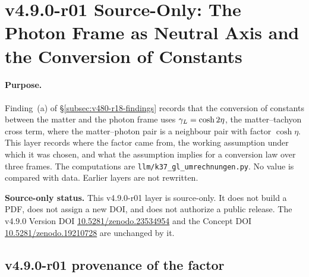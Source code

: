 
\clearpage
\section*{v4.9.0-r01 Source-Only: The Photon Frame as Neutral Axis and the Conversion of Constants}
\label{sec:v490-r01-neutral-axis-conversion}

\paragraph{Purpose.}
Finding~(a) of \S\ref{subsec:v480-r18-findings} records that the conversion of constants between the matter and the
photon frame uses \(\gamma_L=\cosh2\eta\), the matter--tachyon cross term, where the matter--photon pair is a neighbour pair
with factor \(\cosh\eta\).  This layer records where the factor came from, the working assumption under which it was
chosen, and what the assumption implies for a conversion law over three frames.  The computations are
\texttt{llm/k37\_gl\_umrechnungen.py}.  No value is compared with data.  Earlier layers are not rewritten.

\noindent\textbf{Source-only status.}
This v4.9.0-r01 layer is source-only.  It does not build a PDF, does not assign a new DOI,
and does not authorize a public release.  The v4.9.0 Version DOI
\href{https://doi.org/10.5281/zenodo.23534954}{10.5281/zenodo.23534954} and the Concept DOI
\href{https://doi.org/10.5281/zenodo.19210728}{10.5281/zenodo.19210728} are unchanged by it.

\subsection*{v4.9.0-r01 provenance of the factor}
\label{subsec:v490-r01-provenance}

